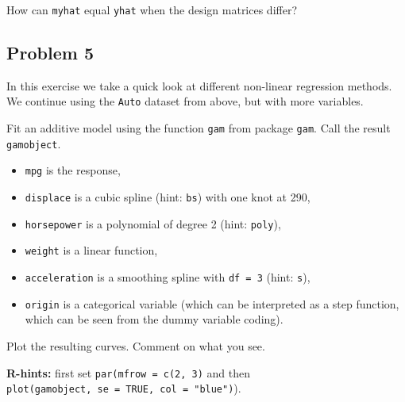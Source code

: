 \documentclass[
]{article}
\newenvironment{Shaded}{\begin{snugshade}}{\end{snugshade}}
\newcommand{\AttributeTok}[1]{\textcolor[rgb]{0.13,0.29,0.53}{#1}}
\newcommand{\CommentTok}[1]{\textcolor[rgb]{0.56,0.35,0.01}{\textit{#1}}}
\newcommand{\DecValTok}[1]{\textcolor[rgb]{0.00,0.00,0.81}{#1}}
\newcommand{\FunctionTok}[1]{\textcolor[rgb]{0.13,0.29,0.53}{\textbf{#1}}}
\newcommand{\NormalTok}[1]{#1}
\newcommand{\OtherTok}[1]{\textcolor[rgb]{0.56,0.35,0.01}{#1}}
\newcommand{\SpecialCharTok}[1]{\textcolor[rgb]{0.81,0.36,0.00}{\textbf{#1}}}
\providecommand{\tightlist}{%
  \setlength{\itemsep}{0pt}\setlength{\parskip}{0pt}}
\begin{document}
\begin{Shaded}
\end{Shaded}

How can \texttt{myhat} equal \texttt{yhat} when the design matrices
differ?

\hypertarget{problem-5}{%
\subsection{Problem 5}\label{problem-5}}

In this exercise we take a quick look at different non-linear regression
methods. We continue using the \texttt{Auto} dataset from above, but
with more variables.

Fit an additive model using the function \texttt{gam} from package
\texttt{gam}. Call the result \texttt{gamobject}.

\begin{itemize}
\tightlist
\item
  \texttt{mpg} is the response,
\item
  \texttt{displace} is a cubic spline (hint: \texttt{bs}) with one knot
  at 290,
\item
  \texttt{horsepower} is a polynomial of degree 2 (hint: \texttt{poly}),
\item
  \texttt{weight} is a linear function,
\item
  \texttt{acceleration} is a smoothing spline with \texttt{df\ =\ 3}
  (hint: \texttt{s}),
\item
  \texttt{origin} is a categorical variable (which can be interpreted as
  a step function, which can be seen from the dummy variable coding).
\end{itemize}

Plot the resulting curves. Comment on what you see.

\textbf{R-hints:} first set \texttt{par(mfrow\ =\ c(2,\ 3)} and then
\texttt{plot(gamobject,\ se\ =\ TRUE,\ col\ =\ "blue")}).
\end{document}
